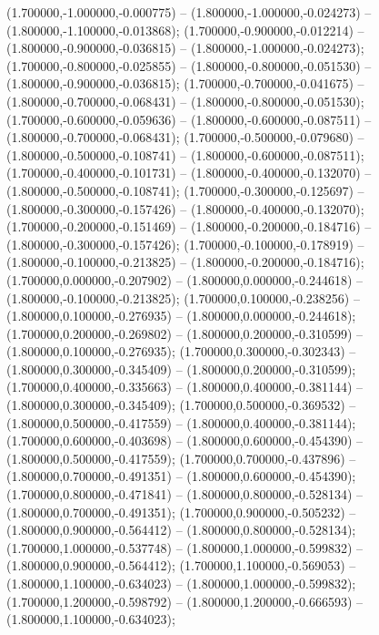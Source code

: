  (1.700000,-1.000000,-0.000775) -- (1.800000,-1.000000,-0.024273) -- (1.800000,-1.100000,-0.013868);
 (1.700000,-0.900000,-0.012214) -- (1.800000,-0.900000,-0.036815) -- (1.800000,-1.000000,-0.024273);
 (1.700000,-0.800000,-0.025855) -- (1.800000,-0.800000,-0.051530) -- (1.800000,-0.900000,-0.036815);
 (1.700000,-0.700000,-0.041675) -- (1.800000,-0.700000,-0.068431) -- (1.800000,-0.800000,-0.051530);
 (1.700000,-0.600000,-0.059636) -- (1.800000,-0.600000,-0.087511) -- (1.800000,-0.700000,-0.068431);
 (1.700000,-0.500000,-0.079680) -- (1.800000,-0.500000,-0.108741) -- (1.800000,-0.600000,-0.087511);
 (1.700000,-0.400000,-0.101731) -- (1.800000,-0.400000,-0.132070) -- (1.800000,-0.500000,-0.108741);
 (1.700000,-0.300000,-0.125697) -- (1.800000,-0.300000,-0.157426) -- (1.800000,-0.400000,-0.132070);
 (1.700000,-0.200000,-0.151469) -- (1.800000,-0.200000,-0.184716) -- (1.800000,-0.300000,-0.157426);
 (1.700000,-0.100000,-0.178919) -- (1.800000,-0.100000,-0.213825) -- (1.800000,-0.200000,-0.184716);
 (1.700000,0.000000,-0.207902) -- (1.800000,0.000000,-0.244618) -- (1.800000,-0.100000,-0.213825);
 (1.700000,0.100000,-0.238256) -- (1.800000,0.100000,-0.276935) -- (1.800000,0.000000,-0.244618);
 (1.700000,0.200000,-0.269802) -- (1.800000,0.200000,-0.310599) -- (1.800000,0.100000,-0.276935);
 (1.700000,0.300000,-0.302343) -- (1.800000,0.300000,-0.345409) -- (1.800000,0.200000,-0.310599);
 (1.700000,0.400000,-0.335663) -- (1.800000,0.400000,-0.381144) -- (1.800000,0.300000,-0.345409);
 (1.700000,0.500000,-0.369532) -- (1.800000,0.500000,-0.417559) -- (1.800000,0.400000,-0.381144);
 (1.700000,0.600000,-0.403698) -- (1.800000,0.600000,-0.454390) -- (1.800000,0.500000,-0.417559);
 (1.700000,0.700000,-0.437896) -- (1.800000,0.700000,-0.491351) -- (1.800000,0.600000,-0.454390);
 (1.700000,0.800000,-0.471841) -- (1.800000,0.800000,-0.528134) -- (1.800000,0.700000,-0.491351);
 (1.700000,0.900000,-0.505232) -- (1.800000,0.900000,-0.564412) -- (1.800000,0.800000,-0.528134);
 (1.700000,1.000000,-0.537748) -- (1.800000,1.000000,-0.599832) -- (1.800000,0.900000,-0.564412);
 (1.700000,1.100000,-0.569053) -- (1.800000,1.100000,-0.634023) -- (1.800000,1.000000,-0.599832);
 (1.700000,1.200000,-0.598792) -- (1.800000,1.200000,-0.666593) -- (1.800000,1.100000,-0.634023);

